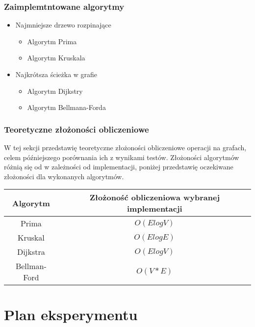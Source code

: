 \documentclass{article}
\begin{document}
        \subsubsection{Zaimplemtntowane algorytmy}
            \begin{itemize}
                \item Najmniejsze drzewo rozpinające
                \begin{itemize}
                    \item Algorytm Prima
                    \item Algorytm Kruskala
                \end{itemize}
                \item Najkrótsza ścieżka w grafie
                \begin{itemize}
                    \item Algorytm Dijkstry
                    \item Algorytm Bellmana-Forda
                \end{itemize}
            \end{itemize}

    \subsubsection{Teoretyczne złożoności obliczeniowe}
    W tej sekcji przedstawię teoretyczne złożoności obliczeniowe operacji na grafach, celem późniejszego porównania ich z wynikami testów.
    Złożoności algorytmów różnią się od w zależności od implementacji, poniżej przedstawię oczekiwane złożoności dla wykonanych algorytmów.
    \begin{center}    
        \begin{tabular}[H]{| c | c |}
            \hline
            Algorytm    & Złożoność obliczeniowa wybranej implementacji \\ \hline \hline
            Prima       & $O(ElogV)$    \\ \hline
            Kruskal     & $O(ElogE)$    \\ \hline
            Dijkstra    & $O(ElogV)$    \\ \hline
            Bellman-Ford& $O(V*E)$    \\ \hline
        \end{tabular}
    \end{center}

\section{Plan eksperymentu}
\end{document}
